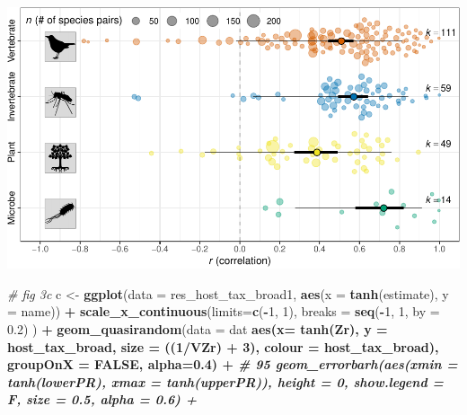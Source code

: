 \documentclass[
]{article}
\newenvironment{Shaded}{\begin{snugshade}}{\end{snugshade}}
\newcommand{\CommentTok}[1]{\textcolor[rgb]{0.56,0.35,0.01}{\textit{#1}}}
\newcommand{\DataTypeTok}[1]{\textcolor[rgb]{0.13,0.29,0.53}{#1}}
\newcommand{\DecValTok}[1]{\textcolor[rgb]{0.00,0.00,0.81}{#1}}
\newcommand{\FloatTok}[1]{\textcolor[rgb]{0.00,0.00,0.81}{#1}}
\newcommand{\KeywordTok}[1]{\textcolor[rgb]{0.13,0.29,0.53}{\textbf{#1}}}
\newcommand{\NormalTok}[1]{#1}
\newcommand{\OperatorTok}[1]{\textcolor[rgb]{0.81,0.36,0.00}{\textbf{#1}}}
\newcommand{\OtherTok}[1]{\textcolor[rgb]{0.56,0.35,0.01}{#1}}
\newcommand{\StringTok}[1]{\textcolor[rgb]{0.31,0.60,0.02}{#1}}
\begin{document}
\includegraphics{Supporting_Information_files/figure-latex/unnamed-chunk-19-1.pdf}

\begin{Shaded}
\begin{Highlighting}[]
\CommentTok{# fig 3c}
\NormalTok{c <-}\StringTok{ }\KeywordTok{ggplot}\NormalTok{(}\DataTypeTok{data =}\NormalTok{ res_host_tax_broad1, }\KeywordTok{aes}\NormalTok{(}\DataTypeTok{x =} \KeywordTok{tanh}\NormalTok{(estimate), }\DataTypeTok{y =}\NormalTok{ name)) }\OperatorTok{+}
\StringTok{  }\KeywordTok{scale_x_continuous}\NormalTok{(}\DataTypeTok{limits=}\KeywordTok{c}\NormalTok{(}\OperatorTok{-}\DecValTok{1}\NormalTok{, }\DecValTok{1}\NormalTok{), }\DataTypeTok{breaks =} \KeywordTok{seq}\NormalTok{(}\OperatorTok{-}\DecValTok{1}\NormalTok{, }\DecValTok{1}\NormalTok{, }\DataTypeTok{by =} \FloatTok{0.2}\NormalTok{) ) }\OperatorTok{+}
\StringTok{  }\KeywordTok{geom_quasirandom}\NormalTok{(}\DataTypeTok{data =}\NormalTok{ dat }\OperatorTok{%
                   \KeywordTok{aes}\NormalTok{(}\DataTypeTok{x=} \KeywordTok{tanh}\NormalTok{(Zr), }\DataTypeTok{y =}\NormalTok{ host_tax_broad, }\DataTypeTok{size =}\NormalTok{ ((}\DecValTok{1}\OperatorTok{/}\NormalTok{VZr) }\OperatorTok{+}\StringTok{ }\DecValTok{3}\NormalTok{), }\DataTypeTok{colour =}\NormalTok{ host_tax_broad), }\DataTypeTok{groupOnX =} \OtherTok{FALSE}\NormalTok{, }\DataTypeTok{alpha=}\FloatTok{0.4}\NormalTok{) }\OperatorTok{+}\StringTok{ }
\StringTok{  }\CommentTok{# 95 %
\StringTok{  }\KeywordTok{geom_errorbarh}\NormalTok{(}\KeywordTok{aes}\NormalTok{(}\DataTypeTok{xmin =} \KeywordTok{tanh}\NormalTok{(lowerPR), }\DataTypeTok{xmax =} \KeywordTok{tanh}\NormalTok{(upperPR)),  }\DataTypeTok{height =} \DecValTok{0}\NormalTok{, }\DataTypeTok{show.legend =}\NormalTok{ F, }\DataTypeTok{size =} \FloatTok{0.5}\NormalTok{, }\DataTypeTok{alpha =} \FloatTok{0.6}\NormalTok{) }\OperatorTok{+}
}}
\end{Highlighting}
\end{Shaded}
\end{document}

